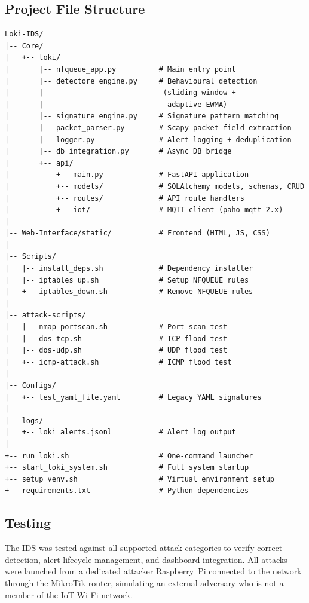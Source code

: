 \documentclass[12pt,a4paper]{article}
\begin{document}
\subsection{Project File Structure}
\label{sec:structure}

\begin{lstlisting}[frame=none,backgroundcolor=\color{white},basicstyle=\ttfamily\footnotesize]
Loki-IDS/
|-- Core/
|   +-- loki/
|       |-- nfqueue_app.py          # Main entry point
|       |-- detectore_engine.py     # Behavioural detection
|       |                            (sliding window +
|       |                             adaptive EWMA)
|       |-- signature_engine.py     # Signature pattern matching
|       |-- packet_parser.py        # Scapy packet field extraction
|       |-- logger.py               # Alert logging + deduplication
|       |-- db_integration.py       # Async DB bridge
|       +-- api/
|           +-- main.py             # FastAPI application
|           +-- models/             # SQLAlchemy models, schemas, CRUD
|           +-- routes/             # API route handlers
|           +-- iot/                # MQTT client (paho-mqtt 2.x)
|
|-- Web-Interface/static/           # Frontend (HTML, JS, CSS)
|
|-- Scripts/
|   |-- install_deps.sh             # Dependency installer
|   |-- iptables_up.sh              # Setup NFQUEUE rules
|   +-- iptables_down.sh            # Remove NFQUEUE rules
|
|-- attack-scripts/
|   |-- nmap-portscan.sh            # Port scan test
|   |-- dos-tcp.sh                  # TCP flood test
|   |-- dos-udp.sh                  # UDP flood test
|   +-- icmp-attack.sh              # ICMP flood test
|
|-- Configs/
|   +-- test_yaml_file.yaml         # Legacy YAML signatures
|
|-- logs/
|   +-- loki_alerts.jsonl           # Alert log output
|
+-- run_loki.sh                     # One-command launcher
+-- start_loki_system.sh            # Full system startup
+-- setup_venv.sh                   # Virtual environment setup
+-- requirements.txt                # Python dependencies
\end{lstlisting}

\subsection{Testing}
\label{sec:testing}

The IDS was tested against all supported attack categories to verify correct detection, alert lifecycle management, and dashboard integration. All attacks were launched from a dedicated attacker Raspberry~Pi connected to the network through the MikroTik router, simulating an external adversary who is not a member of the IoT Wi-Fi network.
\end{document}
